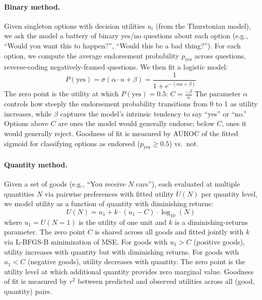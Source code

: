 \paragraph{Binary method.}
Given singleton options with decision utilities $u_i$ (from the Thurstonian model), we ask the model a battery of binary yes/no questions about each option (e.g., ``Would you want this to happen?'', ``Would this be a bad thing?'').
For each option, we compute the average endorsement probability $p_{\text{yes}}$ across questions, reverse-coding negatively-framed questions.
We then fit a logistic model:
\begin{equation*}
P(\text{yes}) = \sigma(\alpha \cdot u + \beta) = \frac{1}{1 + e^{-(\alpha u + \beta)}}
\end{equation*}
The zero point is the utility at which $P(\text{yes}) = 0.5$: $C = \frac{-\beta}{\alpha}$
The parameter $\alpha$ controls how steeply the endorsement probability transitions from 0 to 1 as utility increases, while $\beta$ captures the model's intrinsic tendency to say ``yes'' or ``no.''
Options above $C$ are ones the model would generally endorse; below $C$, ones it would generally reject.
Goodness of fit is measured by AUROC of the fitted sigmoid for classifying options as endorsed ($p_{\text{yes}} \geq 0.5$) vs.\ not.

\paragraph{Quantity method.}
Given a set of goods (e.g., ``You receive $N$ cars''), each evaluated at multiple quantities $N$ via pairwise preferences with fitted utility $U(N)$ per quantity level, we model utility as a function of quantity with diminishing returns:
\begin{equation*}
U(N) = u_1 + k \cdot (u_1 - C) \cdot \log_{10}(N)
\end{equation*}
where $u_1 = U(N{=}1)$ is the utility of one unit and $k$ is a diminishing-returns parameter.
The zero point $C$ is shared across all goods and fitted jointly with $k$ via L-BFGS-B minimization of MSE.
For goods with $u_1 > C$ (positive goods), utility increases with quantity but with diminishing returns.
For goods with $u_1 < C$ (negative goods), utility decreases with quantity.
The zero point is the utility level at which additional quantity provides zero marginal value.
Goodness of fit is measured by $r^2$ between predicted and observed utilities across all (good, quantity) pairs.

